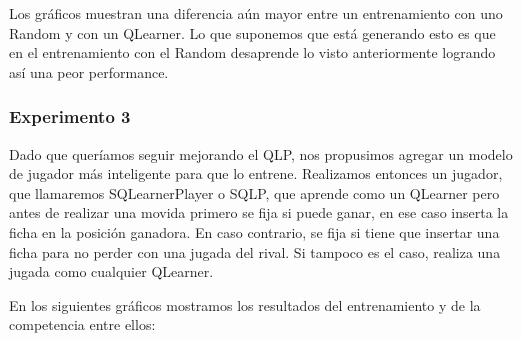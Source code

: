 \documentclass[10pt, a4paper]{article}
\begin{document}
Los gráficos muestran una diferencia aún mayor entre un entrenamiento con uno Random y con un QLearner. Lo que suponemos que está generando esto es que en el entrenamiento con el Random desaprende lo visto anteriormente logrando así una peor performance.


\subsubsection{Experimento 3}

Dado que queríamos seguir mejorando el QLP, nos propusimos agregar un modelo de jugador más inteligente para que lo entrene. Realizamos entonces un jugador, que llamaremos SQLearnerPlayer o SQLP, que aprende como un QLearner pero antes de realizar una movida primero se fija si puede ganar, en ese caso inserta la ficha en la posición ganadora. En caso contrario, se fija si tiene que insertar una ficha para no perder con una jugada del rival. Si tampoco es el caso, realiza una jugada como cualquier QLearner.

En los siguientes gráficos mostramos los resultados del entrenamiento y de la competencia entre ellos:
\end{document}

